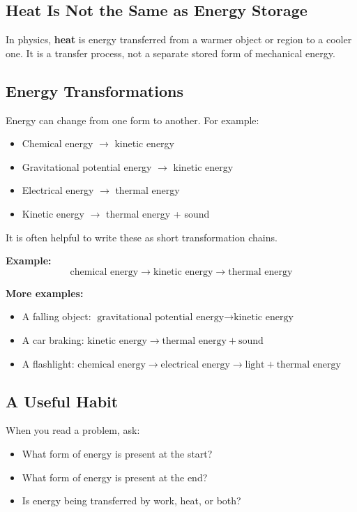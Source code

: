 \subsection{Heat Is Not the Same as Energy Storage}
In physics, \textbf{heat} is energy transferred from a warmer object or region to a cooler one. It is a transfer process, not a separate stored form of mechanical energy.

\subsection{Energy Transformations}
Energy can change from one form to another. For example:
\begin{itemize}
    \item Chemical energy $\rightarrow$ kinetic energy
    \item Gravitational potential energy $\rightarrow$ kinetic energy
    \item Electrical energy $\rightarrow$ thermal energy
    \item Kinetic energy $\rightarrow$ thermal energy + sound
\end{itemize}

It is often helpful to write these as short transformation chains.

\textbf{Example:}
\begin{equation*}
    \text{chemical energy} \rightarrow \text{kinetic energy} \rightarrow \text{thermal energy}
\end{equation*}

\textbf{More examples:}
\begin{itemize}
    \item A falling object: \quad $\text{gravitational potential energy} \rightarrow \text{kinetic energy}$
    \item A car braking: \quad $\text{kinetic energy} \rightarrow \text{thermal energy} + \text{sound}$
    \item A flashlight: \quad $\text{chemical energy} \rightarrow \text{electrical energy} \rightarrow \text{light} + \text{thermal energy}$
\end{itemize}

\subsection{A Useful Habit}
When you read a problem, ask:
\begin{itemize}
    \item What form of energy is present at the start?
    \item What form of energy is present at the end?
    \item Is energy being transferred by work, heat, or both?
\end{itemize}


